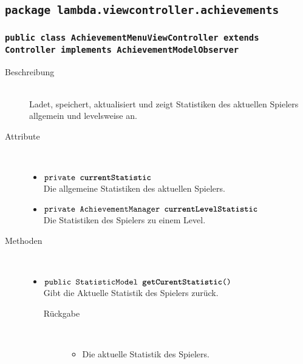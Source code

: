 \subsection{\texttt{package lambda.viewcontroller.achievements}}

\subsubsection{\normalfont \texttt{public class \textbf{AchievementMenuViewController} extends Controller implements AchievementModelObserver}}

\begin{description}
\item[Beschreibung] \hfill \\Ladet, speichert, aktualisiert und zeigt Statistiken des aktuellen Spielers allgemein und levelsweise an.  
\item[Attribute] \hfill \\
	\vspace{-.8cm}
	\begin{itemize}
		\item $\texttt{private  \textbf{currentStatistic}}$ \\ Die allgemeine Statistiken des aktuellen Spielers.
		\item $\texttt{private AchievementManager \textbf{currentLevelStatistic}}$ \\ Die Statistiken des Spielers zu einem Level.
	\end{itemize}
	
\item[Methoden] \hfill \\
	\vspace{-.8cm}
	\begin{itemize}
		\item $\texttt{public StatisticModel \textbf{getCurentStatistic}()}$ \\ Gibt die Aktuelle Statistik des Spielers zurück.
				\begin{description}
					\item[Rückgabe] \hfill \\
					\vspace{-.8cm}
					\begin{itemize}
						\item Die aktuelle Statistik des Spielers.
					\end{itemize}
				\end{description}
				

\end{itemize}
\end{description}

